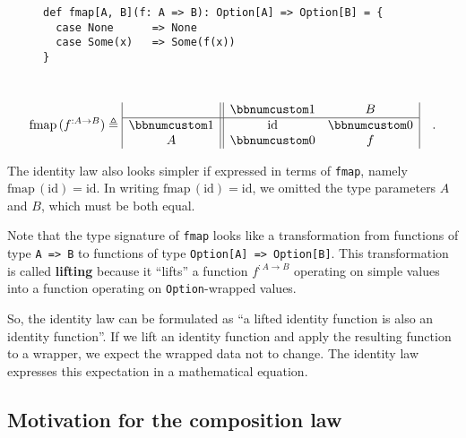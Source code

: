 \begin{wrapfigure}{l}{0.55\columnwidth}%
\vspace{-0\baselineskip}
\begin{lstlisting}
def fmap[A, B](f: A => B): Option[A] => Option[B] = {
  case None      => None
  case Some(x)   => Some(f(x))
}
\end{lstlisting}
\vspace{-2\baselineskip}
\end{wrapfigure}%

~\vspace{-0.7\baselineskip}
\begin{equation}
\text{fmap}\,(f^{:A\rightarrow B})\triangleq\begin{array}{|c||cc|}
 & \bbnum 1 & B\\
\hline \bbnum 1 & \text{id} & \bbnum 0\\
A & \bbnum 0 & f
\end{array}\quad.\label{eq:f-def-opt-fmap-matrix-notation}
\end{equation}
\vspace{-0.5\baselineskip}

The identity law also looks simpler if expressed in terms of \lstinline!fmap!,
namely $\text{fmap}\,(\text{id})=\text{id}$. In writing $\text{fmap}\,(\text{id})=\text{id}$,
we omitted the type parameters $A$ and $B$, which must be both equal.

Note that the type signature of \lstinline!fmap! looks like a transformation
from functions of type \lstinline!A => B! to functions of type \lstinline!Option[A] => Option[B]!.
This transformation is called \textbf{lifting} because
it \textsf{``}lifts\textsf{''} a function $f^{:A\rightarrow B}$ operating on simple
values into a function operating on \lstinline!Option!-wrapped values. 

So, the identity law can be formulated as \textsf{``}a lifted identity function
is also an identity function\textsf{''}. If we lift an identity function and
apply the resulting function to a wrapper, we expect the wrapped data
not to change. The identity law expresses this expectation in a mathematical
equation.

\subsection{Motivation for the composition law}

